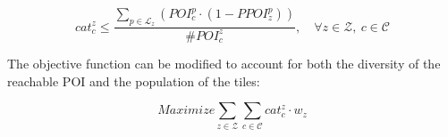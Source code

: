 \begin{equation}
cat^z_c \leq \frac{\sum_{p \in \mathcal{L}_z} \left( POI^p_c \cdot (1 - PPOI^p_z) \right)}{\#POI^z_c}, \quad \forall z \in \mathcal{Z},\ c \in \mathcal{C}
\tag{18}
\end{equation}

The objective function can be modified to account for both the diversity of the reachable POI and the population of the tiles:

\begin{equation}
Maximize \sum_{z \in \mathcal{Z}} \sum_{c \in \mathcal{C}} cat^z_c \cdot w_z
\tag{19}
\end{equation}